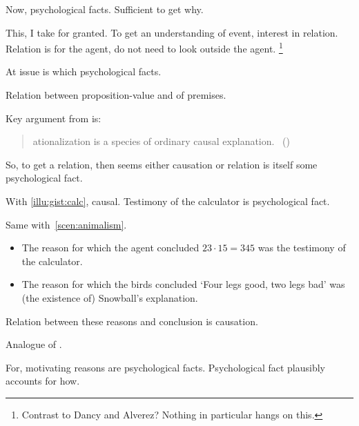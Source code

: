 \begin{note}
  Now, psychological facts.
  Sufficient to get why.

  This, I take for granted.
  To get an understanding of event, interest in relation.
  Relation is for the agent, do not need to look outside the agent.%
  \footnote{
    Contrast to Dancy and Alverez?
    Nothing in particular hangs on this.
  }

  At issue is which psychological facts.

  Relation between proposition-value and \poP{} of premises.

  Key argument from \citeauthor{Davidson:1963aa} is:

  \begin{quote}
    \begin{enumerate}[label=\arabic*]
      [R]ationalization is a species of ordinary causal explanation.\newline
      \mbox{ }\hfill\mbox{(\citeyear[685]{Davidson:1963aa})}
    \end{enumerate}
  \end{quote}

  So, to get a relation, then seems either causation or relation is itself some psychological fact.

  With \autoref{illu:gist:calc}, causal.
  Testimony of the calculator is psychological fact.

  Same with~\autoref{scen:animalism}.

  \begin{itemize}
  \item
    The reason for which the agent concluded \(23 \cdot 15 = 345\) was the testimony of the calculator.
  \item
    The reason for which the birds concluded `Four legs good, two legs bad' was (the existence of) Snowball's explanation.
  \end{itemize}

  Relation between these reasons and conclusion is causation.
\end{note}

\begin{note}
  Analogue of \issueInclusion{}.

  For, motivating reasons are psychological facts.
  Psychological fact plausibly accounts for how.
\end{note}

